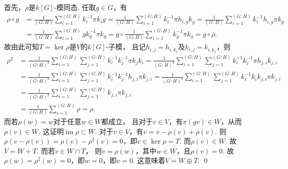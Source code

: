 \begin{enumerate}
    首先，$\rho$是$k[G]$-模同态. 任取$g \in G$，有
    \begin{equation*}\begin{aligned}
        \rho \circ g 
        &= \frac{1}{(G:H)}\sum_{i=1}^{(G:H)}k_{i}^{-1} \pi k_{i}g
        = \frac{1}{(G:H)}\sum_{i=1}^{(G:H)}k_{i}^{-1} \pi h_{i,g}k_{g}
        = \frac{1}{(G:H)}\sum_{i=1}^{(G:H)}k_{i}^{-1} h_{i,g}\pi k_{g} \\
        &= \frac{1}{(G:H)}\sum_{i=1}^{(G:H)}gk_{g}^{-1} \pi k_{g}
        = g \circ \frac{1}{(G:H)}\sum_{i=1}^{(G:H)}k_{g}^{-1} \pi k_{g}
        = g \circ \rho.
    \end{aligned}\end{equation*}
    故由此可知$T=\ker \rho$是$V$的$k[G]$-子模，
    且记$h_{i,j}=h_{i,k_{j}}$及$k_{i,j}=k_{i,k_{j}}$，则
    \begin{equation*}\begin{aligned}
        \rho^{2} 
        &= \frac{1}{(G:H)^{2}}\sum_{i=1}^{(G:H)}
        \sum_{j=1}^{(G:H)}k_{i}^{-1}  k_{j}^{-1} \pi k_{j} k_{i}
        = \frac{1}{(G:H)^{2}}\sum_{i=1}^{(G:H)}
        \sum_{j=1}^{(G:H)}k_{i}^{-1}  k_{j}^{-1} \pi h_{j,i} k_{j,i} \\
        &= \frac{1}{(G:H)^{2}}\sum_{i=1}^{(G:H)}
        \sum_{j=1}^{(G:H)}k_{i}^{-1}  k_{j}^{-1} h_{j,i} \pi k_{j,i}
        = \frac{1}{(G:H)^{2}}\sum_{i=1}^{(G:H)}
        \sum_{j=1}^{(G:H)}k_{i}^{-1}  k_{i} k_{j,i} \pi k_{j,i} \\
        &= \frac{1}{(G:H)^{2}}\sum_{i=1}^{(G:H)}
        \sum_{j=1}^{(G:H)} k_{j,i} \pi k_{j,i} \\
        &= \frac{1}{(G:H)}\sum_{i=1}^{(G:H)}\rho = \rho.
    \end{aligned}\end{equation*}   
    而若$\rho(w) = w$对于任意$w \in W$都成立，
    且对于$v \in V$，有$\pi(gv) \in W$，从而$\rho(v) \in W$. 
    这证明$\operatorname{im}\rho\subset W$.
    对于$v \in V$，有$v = v - \rho(v) + \rho(v)$.
    则$\rho(v - \rho(v)) = \rho(v) - \rho^{2}(v) = 0$，即$v \in \ker \rho = T$.
    而$\rho(v) \in W$. 故$V = W + T$.
    而若$v \in W \cap T$，
    则$v = \rho(w)$，其中$w \in W$，且$\rho(v)=0$.
    故$\rho(w) = \rho^{2}(w) = 0$，即$w=0$，即$v=0$.
    这意味着$V = W \oplus T$. \qed     


\end{enumerate}

